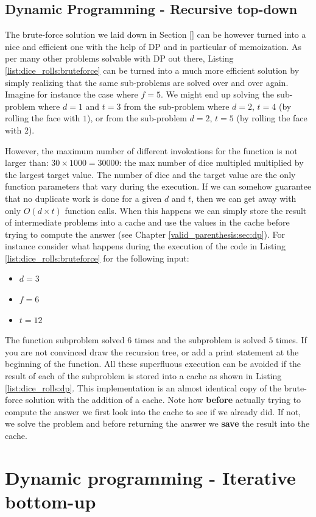 \subsection{Dynamic Programming - Recursive top-down}
\label{dice_rolls:sec:DP}
The brute-force solution we laid down in Section \ref{} can be however turned into a nice and efficient one with the help of DP and in particular of memoization.
As per many other problems solvable with DP out there, 
Listing \ref{list:dice_rolls:bruteforce} can be turned into a much more efficient solution
by simply realizing that the same sub-problems are solved over and over again.
Imagine for instance the case where $f=5$. We might end up solving the sub-problem where $d=1$ and $t=3$  from the sub-problem where $d=2$, $t=4$ (by rolling the face with $1$), or from the sub-problem $d=2$, $t=5$ (by rolling the face with $2$).

However, the maximum number of different invokations for the function 
is not larger than: $30\times 1000 = 30000$: the max number of dice multipled  multiplied by the largest target value. The number of dice and the target value are the only function parameters that vary during the execution.
If we can somehow guarantee that no duplicate work is done for a given $d$ and $t$, then we can get away with only $O(d\times t)$ function calls. 
When this happens we can simply store the result of intermediate problems into a cache and use the values in the cache before trying to compute the answer (see Chapter \ref{valid_parenthesis:sec:dp}). 
For instance consider what happens during the execution of the code in Listing \ref{list:dice_rolls:bruteforce} for the following input:
\begin{itemize}
	\item $d = 3$
	\item $f = 6$
	\item $t = 12$
\end{itemize}

The function subproblem  solved $6$ times and the subproblem  is solved $5$ times. If you are not convinced draw the recursion tree, or add a print statement at the beginning of the function. All these superfluous execution can be avoided if the result of each of the subproblem is stored into a cache as shown in Listing \ref{list:dice_rolls:dp}. This implementation is an almost identical copy of the brute-force solution with the addition of a cache. Note how \textbf{before} actually trying to compute the answer we first look into the cache to see if we already did. If not, we solve the problem and before returning the answer we \textbf{save} the result into the cache.



\section{Dynamic programming - Iterative bottom-up}
\label{dice_rolls:sec:bottom}


